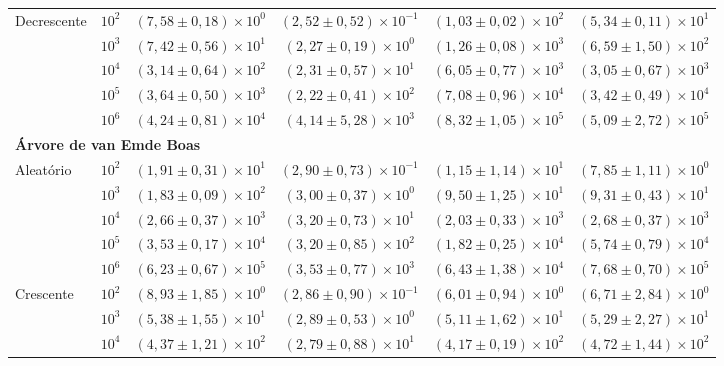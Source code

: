 \documentclass[12pt,a4paper]{report}
\begin{document}
\begin{table}[htbp]
\begin{tabular}{llcccc}
    \cmidrule{2-6}
    \multirow{5}{*}{Decrescente} & $10^{2}$ & $(7,58 \pm 0,18) \times 10^{0}$ & $(2,52 \pm 0,52) \times 10^{-1}$ & $(1,03 \pm 0,02) \times 10^{2}$ & $(5,34 \pm 0,11) \times 10^{1}$ \\
     & $10^{3}$ & $(7,42 \pm 0,56) \times 10^{1}$ & $(2,27 \pm 0,19) \times 10^{0}$ & $(1,26 \pm 0,08) \times 10^{3}$ & $(6,59 \pm 1,50) \times 10^{2}$ \\
     & $10^{4}$ & $(3,14 \pm 0,64) \times 10^{2}$ & $(2,31 \pm 0,57) \times 10^{1}$ & $(6,05 \pm 0,77) \times 10^{3}$ & $(3,05 \pm 0,67) \times 10^{3}$ \\
     & $10^{5}$ & $(3,64 \pm 0,50) \times 10^{3}$ & $(2,22 \pm 0,41) \times 10^{2}$ & $(7,08 \pm 0,96) \times 10^{4}$ & $(3,42 \pm 0,49) \times 10^{4}$ \\
     & $10^{6}$ & $(4,24 \pm 0,81) \times 10^{4}$ & $(4,14 \pm 5,28) \times 10^{3}$ & $(8,32 \pm 1,05) \times 10^{5}$ & $(5,09 \pm 2,72) \times 10^{5}$ \\
    \midrule
    \multicolumn{6}{l}{\textbf{Árvore de van Emde Boas}} \\
    \midrule
    \multirow{5}{*}{Aleatório} & $10^{2}$ & $(1,91 \pm 0,31) \times 10^{1}$ & $(2,90 \pm 0,73) \times 10^{-1}$ & $(1,15 \pm 1,14) \times 10^{1}$ & $(7,85 \pm 1,11) \times 10^{0}$ \\
     & $10^{3}$ & $(1,83 \pm 0,09) \times 10^{2}$ & $(3,00 \pm 0,37) \times 10^{0}$ & $(9,50 \pm 1,25) \times 10^{1}$ & $(9,31 \pm 0,43) \times 10^{1}$ \\
     & $10^{4}$ & $(2,66 \pm 0,37) \times 10^{3}$ & $(3,20 \pm 0,73) \times 10^{1}$ & $(2,03 \pm 0,33) \times 10^{3}$ & $(2,68 \pm 0,37) \times 10^{3}$ \\
     & $10^{5}$ & $(3,53 \pm 0,17) \times 10^{4}$ & $(3,20 \pm 0,85) \times 10^{2}$ & $(1,82 \pm 0,25) \times 10^{4}$ & $(5,74 \pm 0,79) \times 10^{4}$ \\
     & $10^{6}$ & $(6,23 \pm 0,67) \times 10^{5}$ & $(3,53 \pm 0,77) \times 10^{3}$ & $(6,43 \pm 1,38) \times 10^{4}$ & $(7,68 \pm 0,70) \times 10^{5}$ \\
    \cmidrule{2-6}
    \multirow{5}{*}{Crescente} & $10^{2}$ & $(8,93 \pm 1,85) \times 10^{0}$ & $(2,86 \pm 0,90) \times 10^{-1}$ & $(6,01 \pm 0,94) \times 10^{0}$ & $(6,71 \pm 2,84) \times 10^{0}$ \\
     & $10^{3}$ & $(5,38 \pm 1,55) \times 10^{1}$ & $(2,89 \pm 0,53) \times 10^{0}$ & $(5,11 \pm 1,62) \times 10^{1}$ & $(5,29 \pm 2,27) \times 10^{1}$ \\
     & $10^{4}$ & $(4,37 \pm 1,21) \times 10^{2}$ & $(2,79 \pm 0,88) \times 10^{1}$ & $(4,17 \pm 0,19) \times 10^{2}$ & $(4,72 \pm 1,44) \times 10^{2}$ \\

\end{tabular}
\end{table}
\end{document}

